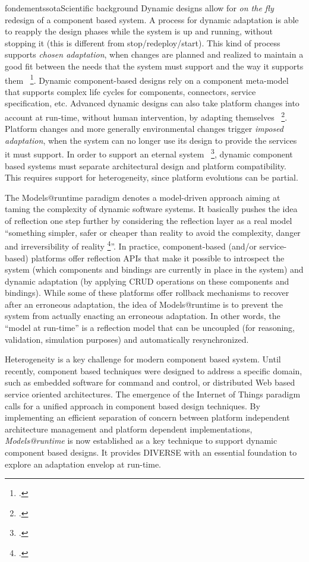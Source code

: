 \documentclass{ra2018}
\newcommand{\team}{DIVERSE}
\begin{document}
\begin{module}{fondements}{sota}{Scientific background}
Dynamic designs allow for \textit{on the fly} redesign of a component based system. 
A  process for dynamic adaptation is able to reapply the  design phases while the system is up and running, without stopping it (this is different from stop/redeploy/start).
This kind of process supports \textit{chosen adaptation}, when changes are planned and realized to maintain a good fit between the needs that the system must support and the way it supports them~  \footcite{Kramer:2007kv}.
Dynamic component-based designs rely on a component meta-model that supports complex life cycles for components, connectors, service specification, etc.
Advanced dynamic designs can also take platform changes into account at run-time, without human intervention, by adapting themselves~  \footcite{Cheng:2009hh,Vromant:NPd9bKZ}.
Platform changes and more generally environmental changes trigger \textit{imposed adaptation}, when the system can no longer use its design to provide the services it must support.
In order to support an eternal system~  \footcite{Bencomo:2009tm}, dynamic component based systems must separate architectural design and platform compatibility.
This requires  support for heterogeneity, since platform evolutions can be partial.

The Models@runtime paradigm denotes a model-driven approach aiming at taming the complexity of dynamic software systems. It basically pushes the idea of reflection one step further by considering the reflection layer as a real model ``something simpler, safer or cheaper than reality to avoid the complexity, danger and irreversibility of reality  \footcite{Rothenberg89thenature}''. In practice, component-based (and/or service-based) platforms offer reflection APIs that make it possible to introspect the system (which components and bindings are currently in place in the system) and dynamic adaptation (by applying CRUD operations on these components and bindings). While some of these platforms offer rollback mechanisms to recover after an erroneous adaptation, the idea of Models@runtime is to prevent the system from actually enacting an erroneous adaptation. In other words, the ``model at run-time'' is a reflection model that can be uncoupled (for reasoning, validation, simulation purposes) and automatically resynchronized.



Heterogeneity is a key challenge for modern component based system. 
Until recently, component based techniques were designed to address a specific domain, such as embedded software for command and control, or distributed Web based service oriented architectures.
The emergence of the Internet of Things paradigm calls for a unified approach in component based design techniques.
By implementing an efficient separation of concern between platform independent architecture management and platform dependent implementations,
\textit{Models@runtime}  is now established as a key technique to support dynamic  component based designs. It provides \team{} with an essential foundation to explore an adaptation envelop at run-time. 


\end{module}
\end{document}
